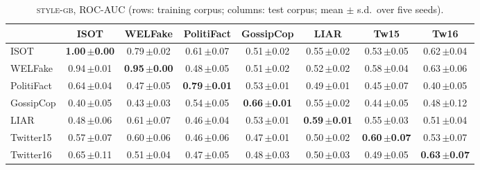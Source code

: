 \begin{table}[h]
\centering
\caption{\textsc{style-gb}, ROC-AUC (rows: training corpus; columns: test corpus; mean $\pm$ s.d.\ over five seeds).}
\scriptsize
\begin{tabular}{@{}lccccccc@{}}
\toprule
 & ISOT & WELFake & PolitiFact & GossipCop & LIAR & Tw15 & Tw16 \\
\midrule
ISOT & \textbf{1.00\,{\tiny$\pm$0.00}} & 0.79\,{\tiny$\pm$0.02} & 0.61\,{\tiny$\pm$0.07} & 0.51\,{\tiny$\pm$0.02} & 0.55\,{\tiny$\pm$0.02} & 0.53\,{\tiny$\pm$0.05} & 0.62\,{\tiny$\pm$0.04} \\
WELFake & 0.94\,{\tiny$\pm$0.01} & \textbf{0.95\,{\tiny$\pm$0.00}} & 0.48\,{\tiny$\pm$0.05} & 0.51\,{\tiny$\pm$0.02} & 0.52\,{\tiny$\pm$0.02} & 0.58\,{\tiny$\pm$0.04} & 0.63\,{\tiny$\pm$0.06} \\
PolitiFact & 0.64\,{\tiny$\pm$0.04} & 0.47\,{\tiny$\pm$0.05} & \textbf{0.79\,{\tiny$\pm$0.01}} & 0.53\,{\tiny$\pm$0.01} & 0.49\,{\tiny$\pm$0.01} & 0.45\,{\tiny$\pm$0.07} & 0.40\,{\tiny$\pm$0.05} \\
GossipCop & 0.40\,{\tiny$\pm$0.05} & 0.43\,{\tiny$\pm$0.03} & 0.54\,{\tiny$\pm$0.05} & \textbf{0.66\,{\tiny$\pm$0.01}} & 0.55\,{\tiny$\pm$0.02} & 0.44\,{\tiny$\pm$0.05} & 0.48\,{\tiny$\pm$0.12} \\
LIAR & 0.48\,{\tiny$\pm$0.06} & 0.61\,{\tiny$\pm$0.07} & 0.46\,{\tiny$\pm$0.04} & 0.53\,{\tiny$\pm$0.01} & \textbf{0.59\,{\tiny$\pm$0.01}} & 0.55\,{\tiny$\pm$0.03} & 0.51\,{\tiny$\pm$0.04} \\
Twitter15 & 0.57\,{\tiny$\pm$0.07} & 0.60\,{\tiny$\pm$0.06} & 0.46\,{\tiny$\pm$0.06} & 0.47\,{\tiny$\pm$0.01} & 0.50\,{\tiny$\pm$0.02} & \textbf{0.60\,{\tiny$\pm$0.07}} & 0.53\,{\tiny$\pm$0.07} \\
Twitter16 & 0.65\,{\tiny$\pm$0.11} & 0.51\,{\tiny$\pm$0.04} & 0.47\,{\tiny$\pm$0.05} & 0.48\,{\tiny$\pm$0.03} & 0.50\,{\tiny$\pm$0.03} & 0.49\,{\tiny$\pm$0.05} & \textbf{0.63\,{\tiny$\pm$0.07}} \\
\bottomrule
\end{tabular}
\end{table}

